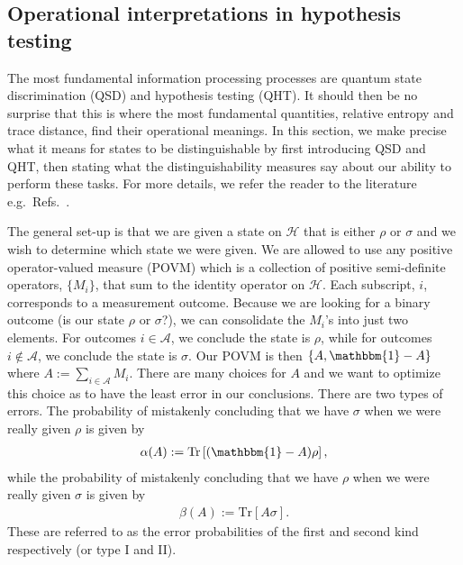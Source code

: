 \documentclass[a4paper,11pt]{article}
\newcommand{\Tr}{\text{Tr}}
\newcommand*{\JKF}[1]{\textcolor{blue}{[JKF: #1]}}
\newcommand*{\SR}[1]{\textcolor{magenta}{[SR: \textsf{#1}]}}
\begin{document}
\subsection{Operational interpretations in hypothesis testing}

The most fundamental information processing processes are quantum state discrimination (QSD) and hypothesis testing (QHT). It should then be no surprise that this is where the most fundamental quantities, relative entropy and trace distance, find their operational meanings. In this section, we make precise what it means for states to be distinguishable by first introducing QSD and QHT, then stating what the distinguishability measures say about our ability to perform these tasks. For more details, we refer the reader to the literature e.g.~Refs.~\cite{Hayashi:1338967,2020arXiv201104672K}.

The general set-up is that we are given a state on $\mathcal{H}$ that is either $\rho$ or $\sigma$ and we wish to determine which state we were given. We are allowed to use any positive operator-valued measure (POVM) 
which is a collection of positive semi-definite operators, $\{ M_i\}$, that sum to the identity operator on $\mathcal{H}$. Each subscript, $i$, corresponds to a measurement outcome. Because we are looking for a binary outcome (is our state $\rho$ or $\sigma$?), we can consolidate the $M_i$'s into just two elements. 
For outcomes $i\in \mathcal{A}$, we conclude the state is $\rho$, while for outcomes $i \notin \mathcal{A}$, we conclude the state is $\sigma$. Our POVM is then $\{ A, \mathbbm{1}-A\}$ where $A := \sum_{i\in\mathcal{A}} M_i $. There are many choices for $A$ and we want to optimize this choice as to have the least error in our conclusions. There are two types of errors. The probability of mistakenly concluding that we have $\sigma$ when we were really given $\rho$ is given by
\begin{align}
    \alpha(A):= \Tr \left[ (\mathbbm{1} - A)\rho\right], 
\end{align}
while the probability of mistakenly concluding that we have $\rho$ when we were really given $\sigma$ is given by
\begin{align}
    \beta(A):= \Tr \left[ A \sigma \right].
\end{align}
These are referred to as the error probabilities of the first and second kind respectively (or type I and II).
\end{document}
